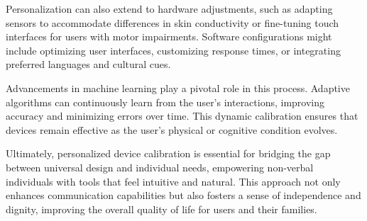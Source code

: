 \documentclass[12pt, research paper]{report}
\begin{document}
	\noindent Personalization can also extend to hardware adjustments, such as adapting sensors to accommodate differences in skin conductivity or fine-tuning touch interfaces for users with motor impairments. Software configurations might include optimizing user interfaces, customizing response times, or integrating preferred languages and cultural cues.
	\bigskip 
	
	\noindent Advancements in machine learning play a pivotal role in this process. Adaptive algorithms can continuously learn from the user’s interactions, improving accuracy and minimizing errors over time. This dynamic calibration ensures that devices remain effective as the user’s physical or cognitive condition evolves.
	\bigskip 
	
	\noindent Ultimately, personalized device calibration is essential for bridging the gap between universal design and individual needs, empowering non-verbal individuals with tools that feel intuitive and natural. This approach not only enhances communication capabilities but also fosters a sense of independence and dignity, improving the overall quality of life for users and their families.
	
\end{document}
